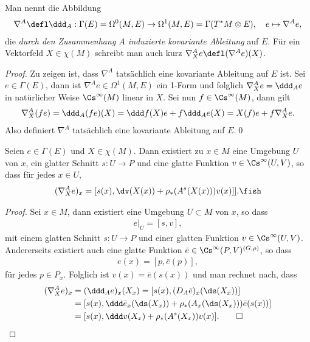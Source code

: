 \documentclass[%
	paper=a5,%
	fleqn,%
	DIV=18,%
	BCOR=0mm,
	fontsize=11pt,
	titlepage=false,%
	bibliography=totoc,
	DIV=18,%
	twoside=true,
	pdftitle=Riemannsche Geometrie,
	pdfauthor=Uwe Semmelmann,
	numbers=noendperiod]%
	{scrbook}
\begin{document}
\begin{defn}
Man nennt die Abbildung
\begin{align*}
\nabla^A \defl \ddd_A : \Gamma(E)=\Omega^0(M,E)\to
\Omega^1(M,E) = \Gamma(T^*M \otimes E),\quad e\mapsto \nabla^A e,
\end{align*}
die \emph{durch den Zusammenhang $A$ induzierte kovariante Ableitung} auf $E$.
Für ein Vektorfeld $X\in \chi(M)$ schreibt man auch kurz $\nabla^A_Xe \defl
(\nabla^A e)(X)$.\fish
\end{defn}
\begin{proof}
Zu zeigen ist, dass $\nabla^A$ tatsächlich eine kovariante Ableitung auf $E$
ist. Sei $e\in\Gamma(E)$, dann ist $\nabla^A e\in\Omega^1(M,E)$ ein 1-Form und
folglich $\nabla^A_X e = \ddd_A e$ in natürlicher Weise $\Cs^\infty(M)$ linear
in $X$. Sei nun $f\in\Cs^\infty(M)$, dann gilt
\begin{align*}
\nabla_X^A (fe) = \ddd_A (fe)(X)
= \ddd f(X)e + f\ddd_A e(X)
= X(f)e + f\nabla_X^A e.
\end{align*}
Also definiert $\nabla^A$ tatsächlich eine kovariante Ableitung auf $E$.\qed
\end{proof}

\begin{prop}
Seien $e\in\Gamma(E)$ und $X\in\chi(M)$. Dann existiert zu $x\in M$ eine
Umgebung $U$ von $x$, ein glatter Schnitt $s: U\to P$ und eine glatte
Funktion $v\in \Cs^\infty(U,V)$, so dass für jedes $x\in U$,
\begin{align*}
(\nabla_X^A e)_x = [s(x),\dv(X(x))+\rho_*(A^s(X(x)))v(x)]].\fish
\end{align*}
\end{prop}
\begin{proof}
Sei $x\in M$, dann existiert eine Umgebung $U\subset M$ von $x$, so dass
\begin{align*}
e\big|_U = [s,v],
\end{align*}
mit einem glatten Schnitt $s: U\to P$ und einer glatten Funktion
$v\in\Cs^\infty(U,V)$. Andererseits existiert auch eine glatte Funktion
$\bar{e}\in \Cs^\infty(P,V)^{(G,\rho)}$, so dass
\begin{align*}
e(x) = [p,\bar{e}(p)],
\end{align*}
für jedes $p\in P_x$. Folglich ist $v(x) = \bar{e}(s(x))$ und man rechnet nach,
dass
\begin{align*}
(\nabla_X^A e)_x &= (\ddd_A e)_x(X_x)
= [s(x),(D_A \bar{e})_x(\ds(X_x))]\\
&= [s(x),\ddd \bar{e}_x(\ds(X_x)) + \rho_*(A_x(\ds(X_x)))\bar{e}(s(x))]\\
&= [s(x),\ddd v(X_x) + \rho_*(A^s(X_x))v(x)].\qed
\end{align*}
\end{proof}
\end{document}
